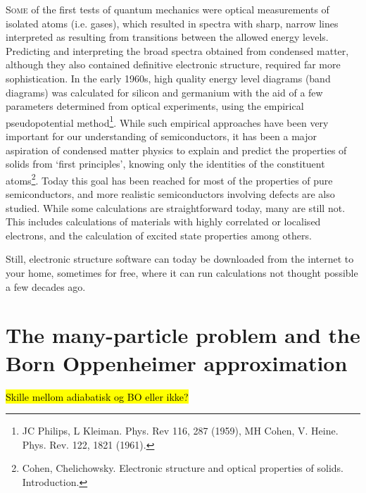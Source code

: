 \documentclass[11pt,bibliography=totoc,index=totoc]{scrbook}   %
\newcommand{\comment}[1]{\hl{#1}}
\begin{document}
\lettrine[lines=3,slope=0pt,nindent=0pt]{S}{ome}
of the first tests of quantum mechanics were optical measurements of
isolated atoms (i.e. gases), which resulted in spectra with sharp, narrow 
lines interpreted as resulting from transitions between the allowed energy 
levels. Predicting and interpreting the broad spectra obtained from condensed 
matter, although they also contained definitive electronic structure, required 
far more sophistication. In the early 1960s, high quality energy level diagrams 
(band diagrams) was calculated for silicon and germanium with the aid of a few
parameters determined from optical experiments, using the empirical
pseudopotential method\footnote{JC Philips, L Kleiman. Phys. Rev 116, 287
(1959), MH Cohen, V. Heine. Phys. Rev. 122, 1821 (1961).}. While such
empirical approaches have been very important for our understanding of
semiconductors, it has been a major aspiration of condensed matter
physics to explain and predict the properties of solids from `first
principles', knowing only the identities of the constituent
atoms\footnote{Cohen, Chelichowsky. Electronic structure and optical
properties of solids. Introduction.}. Today this goal has been reached for
most of the properties of pure semiconductors, and more realistic
semiconductors involving defects are also studied. While some calculations
are straightforward today, many are still not. This includes calculations of
materials with highly correlated or localised electrons, and the calculation
of excited state properties among others.

Still, electronic structure software can today be downloaded from the
internet to your home, sometimes for free, where it can run calculations 
not thought possible a few
decades ago. 

\section{The many-particle problem and the Born Oppenheimer approximation}\label{seq:born-oppenheimer}
\comment{Skille mellom adiabatisk og BO eller ikke?}
\end{document}
